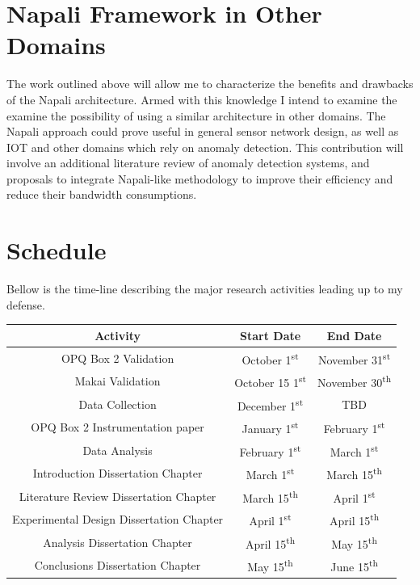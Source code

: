 \section{Napali Framework in Other Domains}
The work outlined above will allow me to characterize the benefits and drawbacks of the Napali architecture. Armed with this knowledge I intend to examine the examine the possibility of using a similar architecture in other domains. The Napali approach could prove useful in general sensor network design, as well as IOT and other domains which rely on anomaly detection. This contribution will involve an additional literature review of anomaly detection systems, and proposals to integrate Napali-like methodology to improve their efficiency and reduce their bandwidth consumptions.


\section{Schedule}
Bellow is the time-line describing the major research activities leading up to my defense.

\begin{center}
\begin{tabular}{ ||c | c c|| }
\hline
 \textbf{Activity} & \textbf{Start Date} & \textbf{End Date} \\ 
 \hline
 \hline
 OPQ Box 2 Validation & October 1\textsuperscript{st} & November 31\textsuperscript{st} \\  
 Makai Validation & October 15 1\textsuperscript{st} & November 30\textsuperscript{th}   \\
 Data Collection & December 1\textsuperscript{st} & TBD   \\
 OPQ Box 2 Instrumentation paper & January 1\textsuperscript{st} & February 1\textsuperscript{st}   \\
 Data Analysis & February 1\textsuperscript{st} & March 1\textsuperscript{st}  \\
 Introduction Dissertation Chapter & March 1\textsuperscript{st}  & March 15\textsuperscript{th}  \\
 Literature Review Dissertation Chapter & March 15\textsuperscript{th} & April 1\textsuperscript{st}  \\
 Experimental Design Dissertation Chapter & April 1\textsuperscript{st} & April 15\textsuperscript{th}  \\
 Analysis Dissertation Chapter & April 15\textsuperscript{th} & May 15\textsuperscript{th}  \\
 Conclusions Dissertation Chapter & May 15\textsuperscript{th} & June 15\textsuperscript{th}  \\
 \hline
 
\end{tabular}
\end{center}
